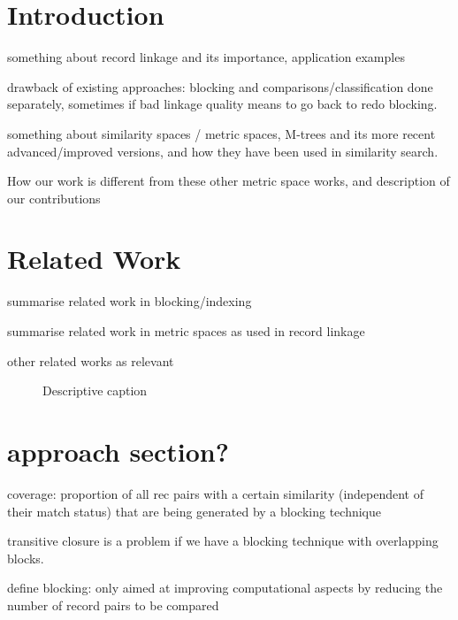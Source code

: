 \documentclass{llncs}
\begin{document}
\section{Introduction}
\label{sec-intro}

something about record linkage and its importance, application examples

drawback of existing approaches: blocking and comparisons/classification
done separately, sometimes if bad linkage quality means to go back to redo
blocking.

something about similarity spaces / metric spaces, M-trees and its
more recent advanced/improved versions, and how they have been used in
similarity search.

How our work is different from these other metric space works, and
description of our contributions


\section{Related Work}
\label{sec-related}

summarise related work in blocking/indexing

summarise related work in metric spaces as used in record linkage

other related works as relevant


\begin{figure}[t]
  \centering
  \caption{Descriptive caption
           \label{fig:xyz}}
\end{figure}

\section{approach section?}
\label{sec-overview}

coverage: proportion of all rec pairs with a certain similarity
(independent of their match status) that are being generated by
a blocking  technique

transitive closure is a problem if we have a blocking technique with overlapping blocks.

define blocking: only aimed at improving computational aspects by reducing the number of record pairs to be compared
\end{document}
